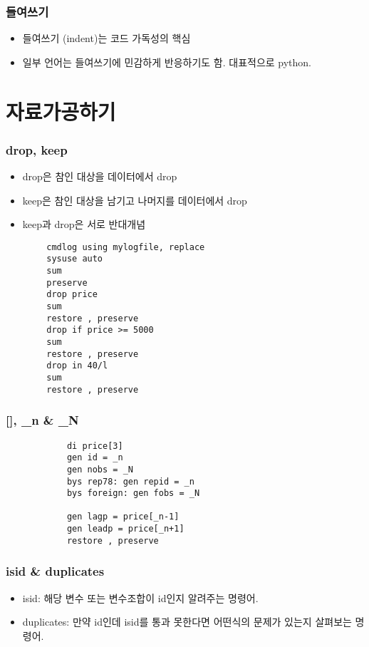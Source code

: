 \documentclass[aspectratio=169,xcolor=dvipsnames,handout]{beamer}
\begin{document}
\begin{frame}[allowframebreaks]
    \frametitle{들여쓰기}
    \begin{itemize}[<+->]
        \item 들여쓰기 (indent)는 코드 가독성의 핵심
        \item 일부 언어는 들여쓰기에 민감하게 반응하기도 함. 대표적으로 python.
    \end{itemize}
\end{frame}


\section{자료가공하기}

\begin{frame}
    \frametitle{drop, keep}
    \begin{itemize}[<+->]
        \item drop은 참인 대상을 데이터에서 drop
        \item keep은 참인 대상을 남기고 나머지를 데이터에서 drop
        \item keep과 drop은 서로 반대개념
    \end{itemize}
    \begin{verbatim}
        cmdlog using mylogfile, replace
        sysuse auto
        sum
        preserve
        drop price
        sum
        restore , preserve
        drop if price >= 5000
        sum
        restore , preserve
        drop in 40/l
        sum
        restore , preserve
    \end{verbatim}
\end{frame}

\begin{frame}[fragile]
    \frametitle{[], \_n \& \_N}
       \begin{verbatim}
            di price[3]
            gen id = _n
            gen nobs = _N
            bys rep78: gen repid = _n
            bys foreign: gen fobs = _N

            gen lagp = price[_n-1]
            gen leadp = price[_n+1]
            restore , preserve
        \end{verbatim}
\end{frame}

\begin{frame}[allowframebreaks]
    \frametitle{isid \& duplicates}
    \begin{itemize}[<+->]
        \item isid: 해당 변수 또는 변수조합이 id인지 알려주는 명령어.
        \item duplicates: 만약 id인데 isid를 통과 못한다면 어떤식의 문제가 있는지 살펴보는 명령어.
    \end{itemize}
\end{frame}
\end{document}
